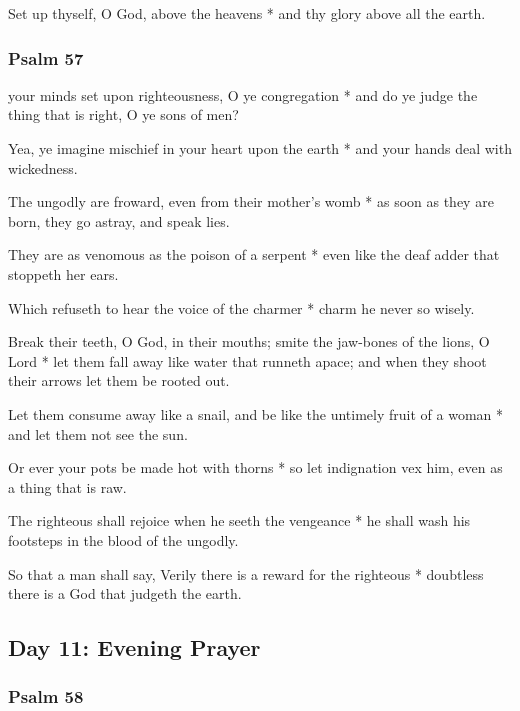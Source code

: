 Set up thyself, O God, above the heavens * and thy glory above all the earth.

\subsubsection{Psalm 57}


 your minds set upon righteousness, O ye congregation * and do ye judge the thing that is right, O ye sons of men?

Yea, ye imagine mischief in your heart upon the earth * and your hands deal with wickedness.

The ungodly are froward, even from their mother's womb * as soon as they are born, they go astray, and speak lies.

They are as venomous as the poison of a serpent * even like the deaf adder that stoppeth her ears.

Which refuseth to hear the voice of the charmer * charm he never so wisely.

Break their teeth, O God, in their mouths; smite the jaw-bones of the lions, O Lord * let them fall away like water that runneth apace; and when they shoot their arrows let them be rooted out.

Let them consume away like a snail, and be like the untimely fruit of a woman * and let them not see the sun.

Or ever your pots be made hot with thorns * so let indignation vex him, even as a thing that is raw.

The righteous shall rejoice when he seeth the vengeance * he shall wash his footsteps in the blood of the ungodly.

So that a man shall say, Verily there is a reward for the righteous * doubtless there is a God that judgeth the earth.

\subsection{Day 11: Evening Prayer}

\subsubsection{Psalm 58}


